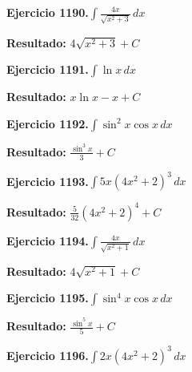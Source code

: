 \documentclass[10pt,a4paper]{article}
\begin{document}
\begin{ejbox}
\textbf{Ejercicio 1190.}\quad $\int \frac{4x}{\sqrt{x^2+3}}\,dx$
\end{ejbox}

\begin{solbox}
\textbf{Resultado:} \(\displaystyle 4\sqrt{x^2+3} + C\)
\end{solbox}

\begin{ejbox}
\textbf{Ejercicio 1191.}\quad $\int \ln x\,dx$
\end{ejbox}

\begin{solbox}
\textbf{Resultado:} \(\displaystyle x\ln x - x + C\)
\end{solbox}

\newpage
\begin{ejbox}
\textbf{Ejercicio 1192.}\quad $\int \sin^{2}x \cos x\,dx$
\end{ejbox}

\begin{solbox}
\textbf{Resultado:} \(\displaystyle \frac{\sin^{3}x}{3} + C\)
\end{solbox}

\begin{ejbox}
\textbf{Ejercicio 1193.}\quad $\int 5x(4x^2 + 2)^{3}\,dx$
\end{ejbox}

\begin{solbox}
\textbf{Resultado:} \(\displaystyle \frac{5}{32}(4x^2+2)^{4} + C\)
\end{solbox}

\begin{ejbox}
\textbf{Ejercicio 1194.}\quad $\int \frac{4x}{\sqrt{x^2+1}}\,dx$
\end{ejbox}

\begin{solbox}
\textbf{Resultado:} \(\displaystyle 4\sqrt{x^2+1} + C\)
\end{solbox}

\newpage
\begin{ejbox}
\textbf{Ejercicio 1195.}\quad $\int \sin^{4}x \cos x\,dx$
\end{ejbox}

\begin{solbox}
\textbf{Resultado:} \(\displaystyle \frac{\sin^{5}x}{5} + C\)
\end{solbox}

\begin{ejbox}
\textbf{Ejercicio 1196.}\quad $\int 2x(4x^2 + 2)^{3}\,dx$
\end{ejbox}
\end{document}
